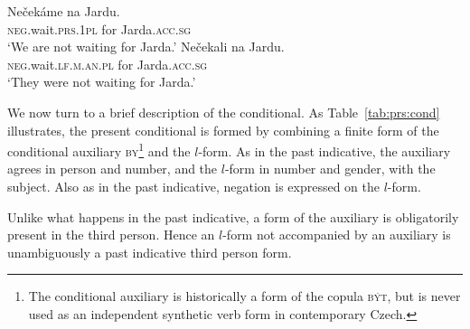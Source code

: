 \documentclass[output=paper]{langsci/langscibook}
\begin{document}
\begin{exe}
\ex\label{ex:basic:prs:neg}\gll Nečekáme na Jardu.\\
\textsc{neg.}wait.\textsc{prs.1pl} for Jarda.\textsc{acc.sg}\\
\glt ‘We are not waiting for Jarda.’
\ex\gll Nečekali  na Jardu.\\ 
\textsc{neg.}wait.\textsc{lf.m.an.pl}  for Jarda.\textsc{acc.sg}\\
\glt ‘They were not waiting for Jarda.’
\ex\label{ex:basic:pst:neg}\begin{xlist}
\end{xlist}
\end{exe}


We now turn to a brief description of the conditional. As Table~\ref{tab:prs:cond} illustrates, the present conditional  is formed by combining a finite form of the conditional auxiliary \textsc{by}\footnote{The conditional auxiliary is historically a form of the copula \textsc{být}, but is never used as an independent synthetic verb form in contemporary Czech.} and the $l$-form. As in the past indicative, the auxiliary agrees in person and number, and the $l$-form in number and gender, with the subject. Also as in the past indicative, negation is expressed on the $l$-form.

\begin{exe}
\end{exe}

 Unlike what happens in the past indicative, a form of the auxiliary is obligatorily present in the third person. Hence an $l$-form not accompanied by an auxiliary is unambiguously a past indicative third person form. 
\end{document}
